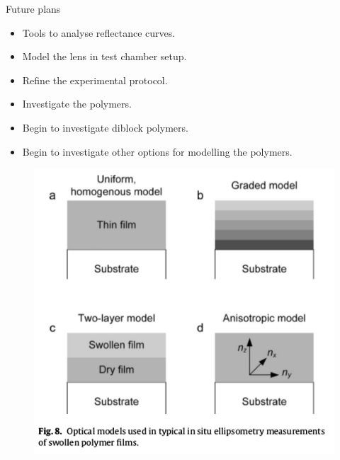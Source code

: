 \documentclass[10pt]{beamer}
\begin{document}
\begin{frame}{Future plans}
\begin{itemize}
\item Tools to analyse reflectance curves.
\item Model the lens in test chamber setup.
\item Refine the experimental protocol.
\item Investigate the polymers.
\item Begin to investigate diblock polymers.
\item Begin to investigate other options for modelling the polymers.
\end{itemize}

\begin{figure}
\centering
\includegraphics[scale = 0.2]{differentmodels.png}
\end{figure}
\end{frame}
\end{document}
